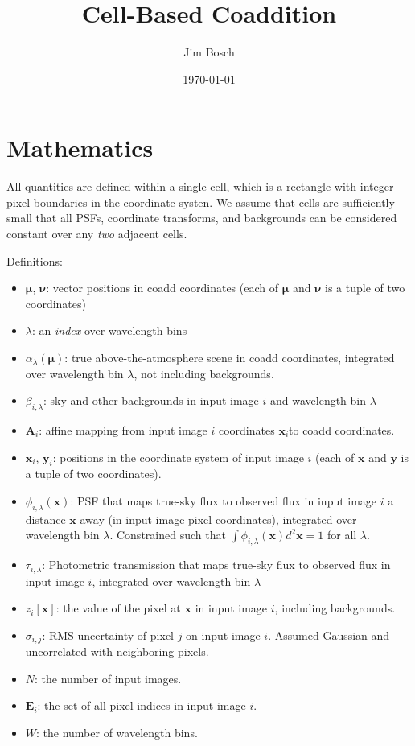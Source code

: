 \documentclass[DM,authoryear,toc]{lsstdoc}
\title{Cell-Based Coaddition}
\author{%
Jim Bosch
}
\date{\today}
\begin{document}
\maketitle

\section{Mathematics}

All quantities are defined within a single cell, which is a rectangle with integer-pixel boundaries in the coordinate systen.
We assume that cells are sufficiently small that all PSFs, coordinate transforms, and backgrounds can be considered constant over any \emph{two} adjacent cells.

Definitions:

\begin{itemize}
\item $\bm{\mu}$, $\bm{\nu}$: vector positions in coadd coordinates (each of $\bm{\mu}$ and $\bm{\nu}$ is a tuple of two coordinates)
\item $\lambda$: an \emph{index} over wavelength bins
\item $\alpha_{\lambda}(\bm{\mu})$: true above-the-atmosphere scene in coadd coordinates, integrated over wavelength bin $\lambda$, not including backgrounds.
\item $\beta_{i,\lambda}$: sky and other backgrounds in input image $i$ and wavelength bin $\lambda$
\item $\bm{A}_i$: affine mapping from input image $i$ coordinates $\bm{x}_i$to coadd coordinates.
\item $\bm{x}_{i}$, $\bm{y}_i$: positions in the coordinate system of input image $i$ (each of $\bm{x}$ and $\bm{y}$ is a tuple of two coordinates).
\item $\phi_{i,\lambda}(\bm{x})$: PSF that maps true-sky flux to observed flux in input image $i$ a distance $\bm{x}$ away (in input image pixel coordinates), integrated over wavelength bin $\lambda$.  Constrained such that
$\int \phi_{i,\lambda}(\bm{x}) d^2\bm{x} = 1$ for all $\lambda$.
\item $\tau_{i,\lambda}$: Photometric transmission that maps true-sky flux to observed flux in input image $i$, integrated over wavelength bin $\lambda$
\item $z_{i}[\bm{x}]$: the value of the pixel at $\bm{x}$ in input image $i$, including backgrounds.
\item $\sigma_{i,j}$: RMS uncertainty of pixel $j$ on input image $i$.  Assumed Gaussian and uncorrelated with neighboring pixels.
\item $N$: the number of input images.
\item $\bm{E}_i$: the set of all pixel indices in input image $i$.
\item $W$: the number of wavelength bins.
\end{itemize}
\end{document}
